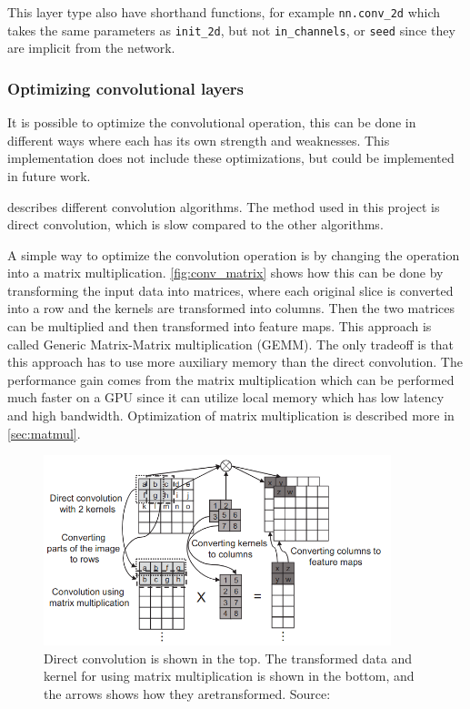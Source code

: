 This layer type also have shorthand functions, for example \texttt{nn.conv\_2d} which takes the same parameters as \texttt{init\_2d}, but not \texttt{in\_channels}, or \texttt{seed} since they are implicit from the network.

\subsubsection*{Optimizing convolutional layers}

It is possible to optimize the convolutional operation, this can be done in different ways where each has its own strength and weaknesses.
This implementation does not include these optimizations, but could be implemented in future work.

\cite{perfomance_analysis_cnn} describes different convolution algorithms.
The method used in this project is direct convolution, which is slow compared to the other algorithms.

A simple way to optimize the convolution operation is by changing the operation into a matrix multiplication. \autoref{fig:conv_matrix} shows how this can be done by transforming the input data into matrices, where each original slice is converted into a row and the kernels are transformed into columns. Then the two matrices can be multiplied and then transformed into feature maps. This approach is called Generic Matrix-Matrix multiplication (GEMM). The only tradeoff is that this approach has to use more auxiliary memory than the direct convolution.
The performance gain comes from the matrix multiplication which can be performed much faster on a GPU since it can utilize local memory which has low latency and high bandwidth. Optimization of matrix multiplication is described more in \autoref{sec:matmul}.

\begin{figure}
    \centering
    \includegraphics[width=0.9\textwidth]{assets/conv-matrix.png}
    \caption{Direct convolution is shown in the top. The transformed data and kernel for using matrix multiplication is shown in the bottom, and the arrows shows how they aretransformed. Source: \cite{perfomance_analysis_cnn}}
    \label{fig:conv_matrix}
\end{figure}

